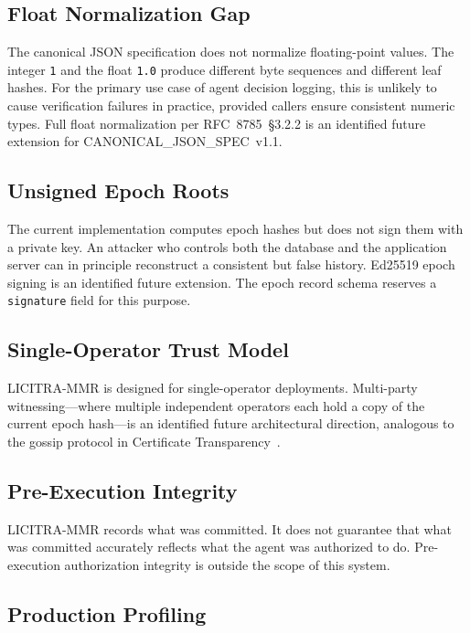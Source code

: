 \documentclass{article}
\begin{document}
\subsection{Float Normalization Gap}

The canonical JSON specification does not normalize floating-point values. The
integer \texttt{1} and the float \texttt{1.0} produce different byte sequences
and different leaf hashes. For the primary use case of agent decision logging,
this is unlikely to cause verification failures in practice, provided callers
ensure consistent numeric types. Full float normalization per RFC~8785~\S3.2.2
is an identified future extension for CANONICAL\_JSON\_SPEC~v1.1.

\subsection{Unsigned Epoch Roots}

The current implementation computes epoch hashes but does not sign them with a
private key. An attacker who controls both the database and the application
server can in principle reconstruct a consistent but false history. Ed25519 epoch
signing is an identified future extension. The epoch record schema reserves a
\texttt{signature} field for this purpose.

\subsection{Single-Operator Trust Model}

LICITRA-MMR is designed for single-operator deployments. Multi-party
witnessing---where multiple independent operators each hold a copy of the current
epoch hash---is an identified future architectural direction, analogous to the
gossip protocol in Certificate Transparency~\cite{laurie2013}.

\subsection{Pre-Execution Integrity}

LICITRA-MMR records what was committed. It does not guarantee that what was
committed accurately reflects what the agent was authorized to do. Pre-execution
authorization integrity is outside the scope of this system.

\subsection{Production Profiling}
\end{document}
